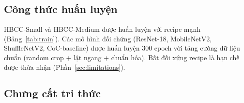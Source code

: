 \documentclass[journal]{IEEEtran}
\begin{document}
\subsection{Công thức huấn luyện}

\begin{table}[!t]
  \caption{Training recipe của HBCC-Small và HBCC-Medium.}
  \label{tab:train}
  \centering
  \renewcommand{\arraystretch}{1.15}
\end{table}

HBCC-Small và HBCC-Medium được huấn luyện với recipe mạnh
(Bảng~\ref{tab:train}). Các mô hình đối chứng (ResNet-18,
MobileNetV2, ShuffleNetV2, CoC-baseline) được huấn luyện 300 epoch
với tăng cường dữ liệu chuẩn (random crop + lật ngang + chuẩn hóa).
Bất đối xứng recipe là hạn chế được thừa nhận (Phần~\ref{sec:limitations}).

\subsection{Chưng cất tri thức}
\label{ssec:kd_setup}
\end{document}
